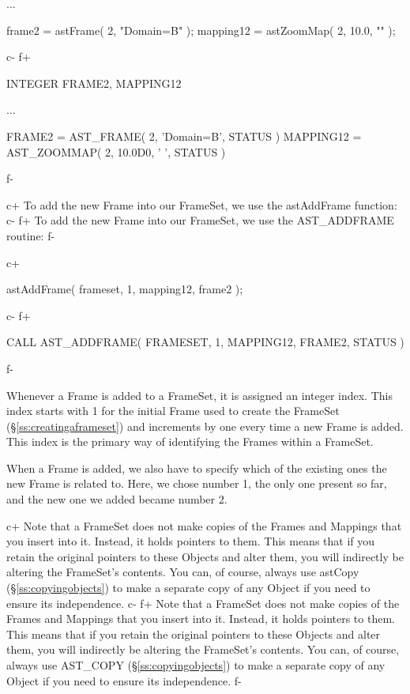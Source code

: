 \documentclass[twoside,11pt]{starlink}
\providecommand{\secref}[1]{\S\ref{#1}}
\begin{document}
{\begin{terminalv}
...

frame2 = astFrame( 2, "Domain=B" );
mapping12 = astZoomMap( 2, 10.0, "" );
\end{terminalv}
\normalsize
c-
f+
\small
\begin{terminalv}
      INTEGER FRAME2, MAPPING12

      ...

      FRAME2 = AST_FRAME( 2, 'Domain=B', STATUS )
      MAPPING12 = AST_ZOOMMAP( 2, 10.0D0, ' ', STATUS )
\end{terminalv}
\normalsize
f-

c+
To add the new Frame into our FrameSet, we use the astAddFrame
function:
c-
f+
To add the new Frame into our FrameSet, we use the AST\_ADDFRAME
routine:
f-

c+
\small
\begin{terminalv}
astAddFrame( frameset, 1, mapping12, frame2 );
\end{terminalv}
\normalsize
c-
f+
\small
\begin{terminalv}
      CALL AST_ADDFRAME( FRAMESET, 1, MAPPING12, FRAME2, STATUS )
\end{terminalv}
\normalsize
f-

Whenever a Frame is added to a FrameSet, it is assigned an integer
index. This index starts with 1 for the initial Frame used to create
the FrameSet (\secref{ss:creatingaframeset}) and increments by one
every time a new Frame is added. This index is the primary way of
identifying the Frames within a FrameSet.

When a Frame is added, we also have to specify which of the existing
ones the new Frame is related to. Here, we chose number 1, the only
one present so far, and the new one we added became number 2.

c+
Note that a FrameSet does not make copies of the Frames and Mappings
that you insert into it. Instead, it holds pointers to them. This
means that if you retain the original pointers to these Objects and
alter them, you will indirectly be altering the FrameSet's
contents. You can, of course, always use astCopy
(\secref{ss:copyingobjects}) to make a separate copy of any Object if
you need to ensure its independence.
c-
f+
Note that a FrameSet does not make copies of the Frames and Mappings
that you insert into it. Instead, it holds pointers to them. This
means that if you retain the original pointers to these Objects and
alter them, you will indirectly be altering the FrameSet's
contents. You can, of course, always use AST\_COPY
(\secref{ss:copyingobjects}) to make a separate copy of any Object if
you need to ensure its independence.
f-

}
\end{document}
